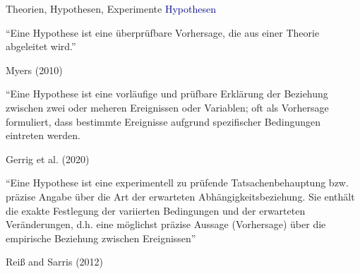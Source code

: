 \documentclass[
  8pt,
  ignorenonframetext,
]{beamer}
\begin{document}
\begin{frame}{Theorien, Hypothesen, Experimente}
\protect\hypertarget{theorien-hypothesen-experimente-2}{}
\textcolor{darkblue}{Hypothesen} \small

``Eine Hypothese ist eine überprüfbare Vorhersage, die aus einer Theorie
abgeleitet wird.''

\flushright

Myers (2010) \vspace{2mm}

\justifying

``Eine Hypothese ist eine vorläufige und prüfbare Erklärung der
Beziehung zwischen zwei oder meheren Ereignissen oder Variablen; oft als
Vorhersage formuliert, dass bestimmte Ereignisse aufgrund spezifischer
Bedingungen eintreten werden.

\flushright

Gerrig et al. (2020) \vspace{2mm}

\justifying

``Eine Hypothese ist eine experimentell zu prüfende Tatsachenbehauptung
bzw. präzise Angabe über die Art der erwarteten Abhängigkeitsbeziehung.
Sie enthält die exakte Festlegung der variierten Bedingungen und der
erwarteten Veränderungen, d.h. eine möglichst präzise Aussage
(Vorhersage) über die empirische Beziehung zwischen Ereignissen''

\flushright

Reiß and Sarris (2012)
\end{frame}
\end{document}
